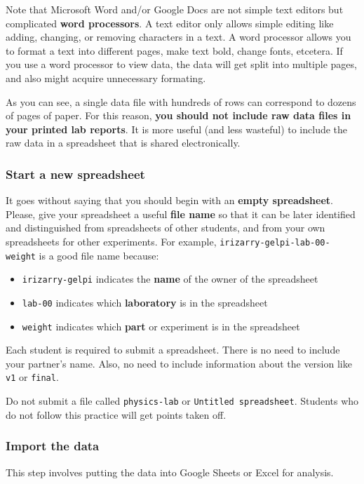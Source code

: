 Note that Microsoft Word and/or Google Docs are not simple text editors but complicated \textbf{word processors}. A text editor only allows simple editing like adding, changing, or removing characters in a text. A word processor allows you to format a text into different pages, make text bold, change fonts, etcetera. If you use a word processor to view data, the data will get split into multiple pages, and also might acquire unnecessary formating.

As you can see, a single data file with hundreds of rows can correspond to dozens of pages of paper. For this reason, \textbf{you should not include raw data files in your printed lab reports}. It is more useful (and less wasteful) to include the raw data in a spreadsheet that is shared electronically.
\subsubsection{Start a new spreadsheet}
It goes without saying that you should begin with an \textbf{empty spreadsheet}. Please, give your spreadsheet a useful \textbf{file name} so that it can be later identified and distinguished from spreadsheets of other students, and from your own spreadsheets for other experiments. For example, \texttt{irizarry-gelpi-lab-00-weight} is a good file name because:
\begin{itemize}
    \item \texttt{irizarry-gelpi} indicates the \textbf{name} of the owner of the spreadsheet
    \item \texttt{lab-00} indicates which \textbf{laboratory} is in the spreadsheet
    \item \texttt{weight} indicates which \textbf{part} or experiment is in the spreadsheet
\end{itemize}
Each student is required to submit a spreadsheet. There is no need to include your partner's name. Also, no need to include information about the version like \texttt{v1} or \texttt{final}.

Do not submit a file called \texttt{physics-lab} or \texttt{Untitled spreadsheet}. Students who do not follow this practice will get points taken off.
\subsubsection{Import the data}
This step involves putting the data into Google Sheets or Excel for analysis.

